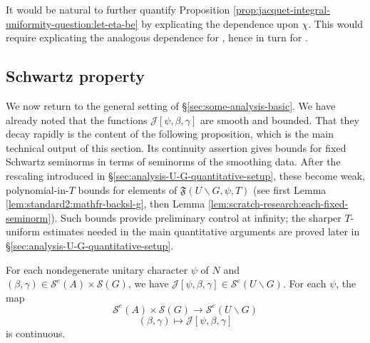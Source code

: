 \begin{remark}\label{rmk:standard2:jacquet-analytic-refine}
  It would be natural to further quantify Proposition \ref{prop:jacquet-integral-uniformity-question:let-eta-be} by explicating the dependence upon $\chi$.  This would require explicating the analogous dependence for \cite[Cor 2]{MR2402686}, hence in turn for \cite[\S10.1.11]{MR1170566}.
\end{remark}


\subsection{Schwartz property}\label{sec:qual-jacquet-schwartz}
We now return to the general setting of \S\ref{sec:some-analysis-basic}.  We have already noted that the functions $\mathcal{J}[\psi,\beta,\gamma]$ are smooth and bounded.  That they decay rapidly is the content of the following proposition, which is the main technical output of this section.  Its continuity assertion gives bounds for fixed Schwartz seminorms in terms of seminorms of the smoothing data.  After the rescaling introduced in \S\ref{sec:analysis-U-G-quantitative-setup}, these become weak, polynomial-in-$T$ bounds for elements of $\mathfrak{F}(U \backslash G,\psi,T)$ (see first Lemma \ref{lem:standard2:mathfr-backsl-g}, then Lemma \ref{lem:scratch-research:each-fixed-seminorm}).  Such bounds provide preliminary control at infinity; the sharper $T$-uniform estimates needed in the main quantitative arguments are proved later in \S\ref{sec:analysis-U-G-quantitative-setup}.
\begin{proposition}\label{lem:sub-gln:each-psi-beta}
  For each nondegenerate unitary character $\psi$ of $N$ and $(\beta,\gamma) \in \mathcal{S}^e(A) \times \mathcal{S}(G)$, we have $\mathcal{J}[\psi,\beta,\gamma] \in \mathcal{S}^e(U \backslash G)$.  For each $\psi$, the map
  \begin{equation*}
    \mathcal{S}^e(A) \times \mathcal{S}(G) \rightarrow \mathcal{S}^e(U \backslash G)
  \end{equation*}
  \begin{equation}\label{eq:beta-gamma-mapsto}
    (\beta,\gamma) \mapsto \mathcal{J}[\psi,\beta,\gamma]
  \end{equation}
  is continuous.
\end{proposition}
